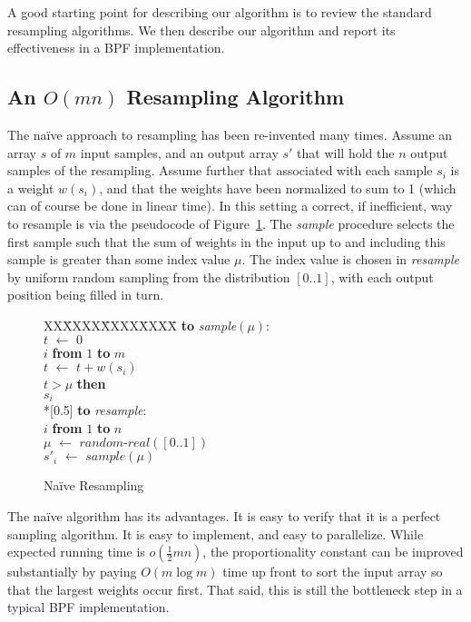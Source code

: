 \documentclass[12pt]{article}
\newcommand{\asgn}{\,\,\leftarrow\,\,}
\newcommand{\newcode}{\\*[0.5\baselineskip]}
\begin{document}
  A good starting point for describing our algorithm is to
  review the standard resampling algorithms.  We then
  describe our algorithm and report its effectiveness in a
  BPF implementation.

\subsection{An $O(mn)$ Resampling Algorithm}

  The na\"ive approach to resampling has been re-invented
  many times.  Assume an array $s$ of $m$ input samples, and an
  output array $s'$ that will hold the $n$ output samples of
  the resampling.  Assume
  further that associated with each sample $s_i$ is a
  weight $w(s_i)$, and that the weights have been normalized
  to sum to 1 (which can of course be done in linear time).
  In this setting a correct, if inefficient, way to resample is via the
  pseudocode of Figure~\ref{fig-omn}.  The {\em sample}
  procedure selects the first sample such that the sum of
  weights in the input up to and including this sample is
  greater than some index value $\mu$.  The index value is chosen
  in {\em resample} by uniform random sampling from the distribution
  $[0..1]$, with each output position being filled in
  turn.

  \begin{figure}
    \centering
    \begin{minipage}{0.6\textwidth}
      \begin{tabbing}
      XX\=XXXX\=XXXX\=XXXX\=\kill
      {\bf to} {\it sample}$(\mu)$: \\
      \>$t \asgn 0$\\
       $i$ {\bf from} $1$ {\bf to} $m$\\
      \>\>$t \asgn t + w(s_i)$\\
      \> $t > \mu$ {\bf then}\\
      \>\> $s_i$\newcode
      {\bf to} {\it resample}: \\
       $i$ {\bf from} $1$ {\bf to} $n$\\
      \>\>$\mu \asgn \textit{random-real}([0..1])$\\
      \>\>$s'_i \asgn sample(\mu)$
      \end{tabbing}
    \end{minipage}
    \caption{Na\"ive Resampling}\label{fig-omn}
  \end{figure}

  The na\"ive algorithm has its advantages.  It is easy to
  verify that it is a perfect sampling algorithm.  It is
  easy to implement, and easy to parallelize.  While
  expected running time is $o(\frac{1}{2}mn)$, the
  proportionality constant can be improved substantially by
  paying $O(m \log m)$ time up front to sort the input array
  so that the largest weights occur first.  That said, this
  is still the bottleneck step in a typical BPF
  implementation.
\end{document}
